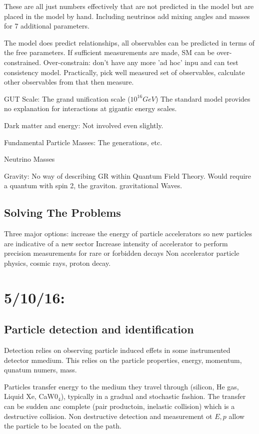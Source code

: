 \documentclass[]{article}
\begin{document}
These are all just numbers effectively that are not predicted in the model but are placed in the model by hand. Including neutrinos add mixing angles and masses for 7 additional parameters.

The model does predict relationships, all observables can be predicted in terms of the free parameters. If sufficient measurements are made, SM can be over-constrained. Over-constrain: don't have any more 'ad hoc' inpu and can test consistency model. Practically, pick well measured set of observables, calculate other observables from that then measure.

GUT Scale:
The grand unification scale ($10^{16}GeV$) The standard model provides no explanation for interactions at gigantic energy scales.

Dark matter and energy:
Not involved even slightly. 

Fundamental Particle Masses:
The generations, etc.

Neutrino Masses

Gravity:
No way of describing GR within Quantum Field Theory. Would require a quantum with spin 2, the graviton. gravitational Waves.

\subsection{Solving The Problems}

Three major options: increase the energy of particle accelerators so new particles are indicative of a new sector
Increase intensity of accelerator to perform precision measurements for rare or forbidden decays
Non accelerator particle physics, cosmic rays, proton decay.

\section{5/10/16: }

	\subsection{Particle detection and identification}
	
		Detection relies on observing particle induced effets in some instrumented detector mmedium.
		This relies on the particle properties, energy, momentum, qunatum numers, mass.
		
		Particles transfer energy to the medium they travel through (silicon, He gas, Liquid Xe, CaW0$_4$), typically in a gradual and stochastic fashion.
		The transfer can be sudden anc complete (pair productoin, inelastic collision) which is a destructive collision.
		Non destructive detection and measurement ot $E, p$ allow the particle to be located on the path.
		
\end{document}
